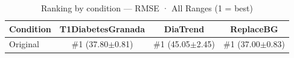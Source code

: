 \begin{table}[htbp]
\centering
\small
\caption{Ranking by condition — RMSE · All Ranges  (1 = best)}
\label{tab:ranking_rmse_entire_family_mechanism_baseline}
\begin{tabular}{lccc}
\toprule
\textbf{Condition} & \textbf{T1DiabetesGranada} & \textbf{DiaTrend} & \textbf{ReplaceBG} \\
\midrule
Original & \#1 (37.80$\pm$0.81) & \#1 (45.05$\pm$2.45) & \#1 (37.00$\pm$0.83) \\
\bottomrule
\end{tabular}
\end{table}